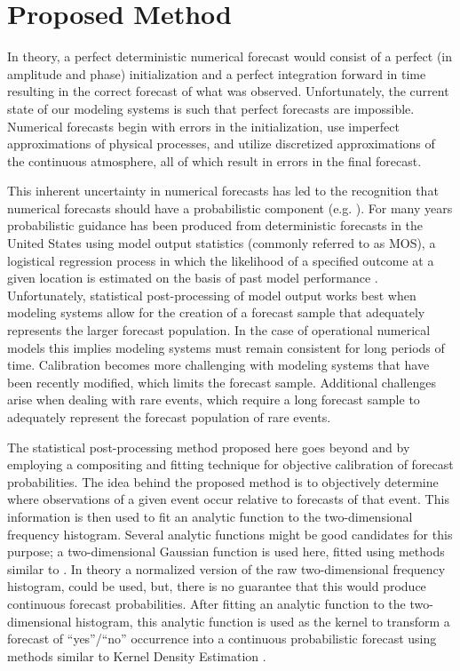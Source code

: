 

\chapter{Proposed Method}
\label{method}

In theory, a perfect deterministic numerical forecast would consist of a perfect (in amplitude and phase) initialization and a perfect integration forward in time resulting in the correct forecast of what was observed.
Unfortunately, the current state of our modeling systems is such that perfect forecasts are impossible.
Numerical forecasts begin with errors in the initialization, use imperfect approximations of physical processes, and utilize discretized approximations of the continuous atmosphere, all of which result in errors in the final forecast.

This inherent uncertainty in numerical forecasts has led to the recognition that numerical forecasts should have a probabilistic component (e.g. \citealp{Glahn1972, Murphy1993, Glahn2009}).
For many years probabilistic guidance has been produced from deterministic forecasts in the United States using model output statistics (commonly referred to as MOS), a logistical regression process in which the likelihood of a specified outcome at a given location is estimated on the basis of past model performance \citep{Glahn1972}.
Unfortunately, statistical post-processing of model output works best when modeling systems allow for the creation of a forecast sample that adequately represents the larger forecast population.
In the case of operational numerical models this implies modeling systems must remain consistent for long periods of time.
Calibration becomes more challenging with modeling systems that have been recently modified, which limits the forecast sample.
Additional challenges arise when dealing with rare events, which require a long forecast sample to adequately represent the forecast population of rare events.

The statistical post-processing method proposed here goes beyond \cite{Theis2005} and \cite{Sobash2011} by employing a compositing and fitting technique for objective calibration of forecast probabilities.
The idea behind the proposed method is to objectively determine where observations of a given event occur relative to forecasts of that event.
This information is then used to fit an analytic function to the two-dimensional frequency histogram.
Several analytic functions might be good candidates for this purpose; a two-dimensional Gaussian function is used here, fitted using methods similar to \cite{Lak2010}.
In theory a normalized version of the raw two-dimensional frequency histogram, could be used, but, there is no guarantee that this would produce continuous forecast probabilities.
After fitting an analytic function to the two-dimensional histogram, this analytic function is used as the kernel to transform a forecast of ``yes''/``no'' occurrence into a continuous probabilistic forecast using methods similar to Kernel Density Estimation \citep{Silverman1986}.




